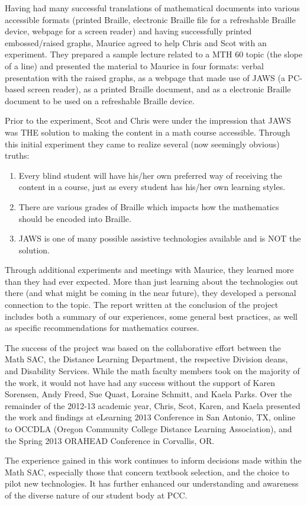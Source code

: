 Having had many successful translations of mathematical documents into various accessible
formats (printed Braille, electronic Braille file for a refreshable Braille device, webpage
for a screen reader) and having successfully printed embossed/raised graphs, Maurice agreed
to help Chris and Scot with an experiment.  They prepared a sample lecture related to a MTH 60 topic (the
slope of a line) and presented the material to Maurice in four formats: verbal presentation
with the raised graphs, as a webpage that made use of JAWS (a PC-based screen reader), as
a printed Braille document, and as a electronic Braille document to be used on a refreshable Braille device. 

Prior to the experiment, Scot and Chris were under the impression that JAWS was THE solution to
making the content in a math course accessible.  Through this initial experiment they came to
realize several (now seemingly obvious) truths:
\begin{enumerate}
	\item  Every blind student will have his/her own preferred way of receiving the content in a
	course, just as every student has his/her own learning styles.
	\item There are various grades of Braille which impacts how the mathematics should be encoded into Braille.
	\item JAWS is one of many possible assistive technologies available and is NOT the solution.
\end{enumerate}

Through additional experiments and meetings with Maurice, they learned more than they had ever expected. 
More than just learning about the technologies out there (and what might be coming in the near future),
they developed a personal connection to the topic.  The report written at the conclusion of the project 
includes both a summary of our experiences, some general best practices, as well as specific recommendations for mathematics courses.

The success of the project was based on the collaborative effort between the Math SAC, the Distance
Learning Department, the respective Division deans,  and Disability Services.  While the math faculty members took on the majority
of the work, it would not have had any success without the support of Karen Sorensen, Andy Freed, Sue Quast, Loraine Schmitt,
and Kaela Parks.  Over the remainder of the 2012-13 academic year, Chris, Scot, Karen, and Kaela
presented the work and findings at eLearning 2013 Conference in San Antonio, TX, online to OCCDLA
(Oregon Community College Distance Learning Association), and the Spring 2013 ORAHEAD Conference in Corvallis, OR. 

The experience gained in this work continues to inform decisions made within the Math SAC, especially those that concern textbook selection,
and the choice to pilot new technologies. It has further enhanced our understanding and awareness of the diverse nature of our student body at PCC.
